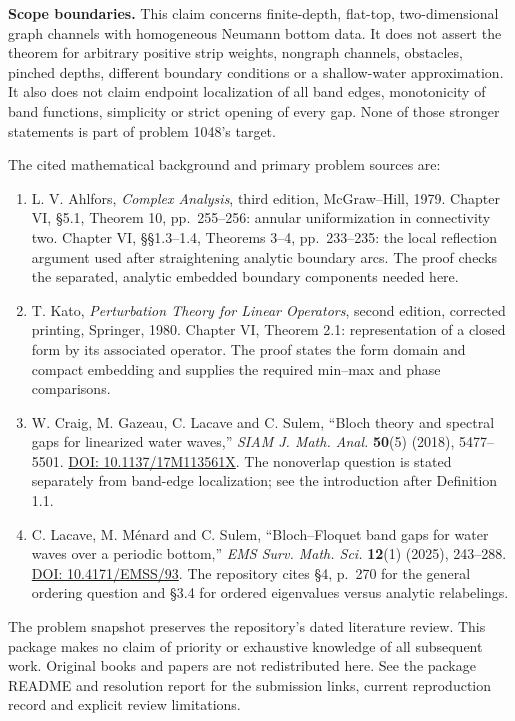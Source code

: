 \documentclass[11pt]{article}
\begin{document}
\textbf{Scope boundaries.} This claim concerns finite-depth, flat-top,
two-dimensional graph channels with homogeneous Neumann bottom data.
It does not assert the theorem for arbitrary positive strip weights,
nongraph channels, obstacles, pinched depths, different boundary conditions
or a shallow-water approximation. It also does not claim endpoint
localization of all band edges, monotonicity of band functions, simplicity
or strict opening of every gap. None of those stronger statements is
part of problem 1048's target.

The cited mathematical background and primary problem sources are:
\begin{enumerate}
\item L. V. Ahlfors, \emph{Complex Analysis}, third edition, McGraw--Hill,
1979. Chapter VI, \S5.1, Theorem 10, pp.~255--256: annular
uniformization in connectivity two. Chapter VI, \S\S1.3--1.4,
Theorems 3--4, pp.~233--235: the local reflection argument used after
straightening analytic boundary arcs. The proof checks the separated,
analytic embedded boundary components needed here.
\item T. Kato, \emph{Perturbation Theory for Linear Operators}, second
edition, corrected printing, Springer, 1980. Chapter VI, Theorem 2.1:
representation of a closed form by its associated operator. The proof
states the form domain and compact embedding and supplies the required
min--max and phase comparisons.
\item W. Craig, M. Gazeau, C. Lacave and C. Sulem, ``Bloch theory and
spectral gaps for linearized water waves,'' \emph{SIAM J. Math. Anal.}
\textbf{50}(5) (2018), 5477--5501.
\href{https://doi.org/10.1137/17M113561X}{DOI: 10.1137/17M113561X}.
The nonoverlap question is stated separately from band-edge localization;
see the introduction after Definition 1.1.
\item C. Lacave, M. M\'enard and C. Sulem, ``Bloch--Floquet band gaps for
water waves over a periodic bottom,'' \emph{EMS Surv. Math. Sci.}
\textbf{12}(1) (2025), 243--288.
\href{https://doi.org/10.4171/EMSS/93}{DOI: 10.4171/EMSS/93}.
The repository cites \S4, p.~270 for the general ordering question and
\S3.4 for ordered eigenvalues versus analytic relabelings.
\end{enumerate}

The problem snapshot preserves the repository's dated literature review.
This package makes no claim of priority or exhaustive knowledge of all
subsequent work. Original books and papers are not redistributed here.
See the package README and resolution report for the submission links,
current reproduction record and explicit review limitations.
\end{document}
